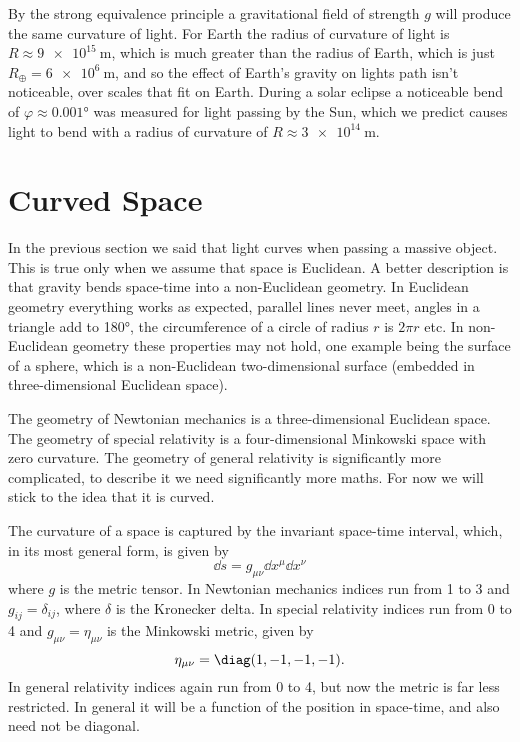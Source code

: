 \documentclass[fleqn]{NotesClass}
\begin{document}
    By the strong equivalence principle a gravitational field of strength \(g\) will produce the same curvature of light.
    For Earth the radius of curvature of light is \(R \approx \qty{9e15}{\metre}\), which is much greater than the radius of Earth, which is just \(R_{\oplus} = \qty{6e6}{\metre}\), and so the effect of Earth's gravity on lights path isn't noticeable, over scales that fit on Earth.
    During a solar eclipse a noticeable bend of \(\varphi \approx \ang{0.001}\) was measured for light passing by the Sun, which we predict causes light to bend with a radius of curvature of \(R \approx \qty{3e14}{\metre}\).
    
    \section{Curved Space}
    In the previous section we said that light curves when passing a massive object.
    This is true only when we assume that space is Euclidean.
    A better description is that gravity bends space-time into a non-Euclidean geometry.
    In Euclidean geometry everything works as expected, parallel lines never meet, angles in a triangle add to \ang{180}, the circumference of a circle of radius \(r\) is \(2\pi r\) etc.
    In non-Euclidean geometry these properties may not hold, one example being the surface of a sphere, which is a non-Euclidean two-dimensional surface (embedded in three-dimensional Euclidean space).
    
    The geometry of Newtonian mechanics is a three-dimensional Euclidean space.
    The geometry of special relativity is a four-dimensional Minkowski space with zero curvature.
    The geometry of general relativity is significantly more complicated, to describe it we need significantly more maths.
    For now we will stick to the idea that it is curved.
    
    The curvature of a space is captured by the invariant space-time interval, which, in its most general form, is given by
    \begin{equation}
        \dd{s} = g_{\mu\nu}\dd{x^\mu}\dd{x^\nu}
    \end{equation}
    where \(g\) is the metric tensor.
    In Newtonian mechanics indices run from 1 to 3 and \(g_{ij} = \delta_{ij}\), where \(\delta\) is the Kronecker delta.
    In special relativity indices run from 0 to 4 and \(g_{\mu\nu} = \eta_{\mu\nu}\) is the Minkowski metric, given by
    \begin{equation}
        \eta_{\mu\nu} = \diag(1, -1, -1, -1).
    \end{equation}
    In general relativity indices again run from 0 to 4, but now the metric is far less restricted.
    In general it will be a function of the position in space-time, and also need not be diagonal.
    
\end{document}
